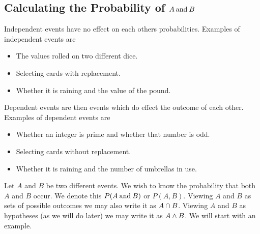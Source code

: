     \subsection{Calculating the Probability of \texorpdfstring{\(A\mathbin{\operatorname{and}} B\)}{A and B}}
    Independent events have no effect on each others probabilities.
    Examples of independent events are
    \begin{itemize}
        \item The values rolled on two different dice.
        \item Selecting cards with replacement.
        \item Whether it is raining and the value of the pound.
    \end{itemize}
    Dependent events are then events which do effect the outcome of each other.
    Examples of dependent events are
    \begin{itemize}
        \item Whether an integer is prime and whether that number is odd.
        \item Selecting cards without replacement.
        \item Whether it is raining and the number of umbrellas in use.
    \end{itemize}
    
    Let \(A\) and \(B\) be two different events.
    We wish to know the probability that both \(A\) and \(B\) occur.
    We denote this \(P(A\mathbin{\operatorname{and}} B)\) or \(P(A, B)\).
    Viewing \(A\) and \(B\) as sets of possible outcomes we may also write it as \(A\cap B\).
    Viewing \(A\) and \(B\) as hypotheses (as we will do later) we may write it as \(A\wedge B\).
    We will start with an example.
    
